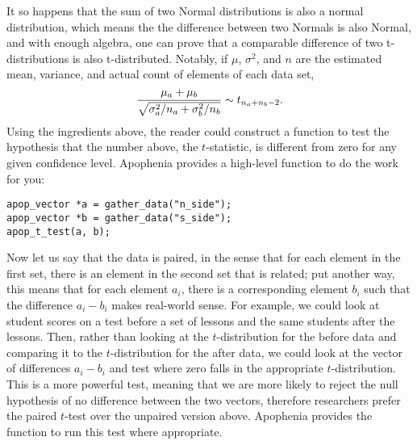 It so happens that the sum of two Normal distributions is also a normal
distribution, which means the the difference between two Normals is also
Normal, and with enough algebra, one can prove that a comparable difference of 
two t-distributions is also t-distributed. Notably, if $\mu$,
$\sigma^2$, and $n$ are the estimated mean, variance, and actual count
of elements of each data set,
$${\mu_a + \mu_b \over \sqrt{\sigma^2_a/n_a + \sigma^2_b/n_b}} \sim t_{n_a + n_b -2}.$$
Using the ingredients above, the reader could construct a function to
test the hypothesis that the number above, the $t$-statistic, is
different from zero for any given confidence level. Apophenia provides a
high-level function to do the work for you:

\begin{lstlisting}
apop_vector *a = gather_data("n_side");
apop_vector *b = gather_data("s_side");
apop_t_test(a, b);
\end{lstlisting}

Now let us say that the data is paired, in the sense that for each
element in the first set, there is an element in the second set that is
related; put another way, this means that for each element $a_i$, there
is a corresponding element $b_i$ such that the difference $a_i - b_i$
makes real-world sense. For example, we could look at student scores on
a test before a set of lessons and the same students after the lessons.
Then, rather than looking at the $t$-distribution for the before data
and comparing it to the $t$-distribution for the after data, we could
look at the vector of differences $a_i - b_i$ and test where zero falls
in the appropriate $t$-distribution. This is a more powerful test,
meaning that we are more likely to reject the null hypothesis of no
difference between the two vectors, therefore researchers prefer the
paired $t$-test over the unpaired version above. Apophenia provides the
 function to run this test where appropriate.

